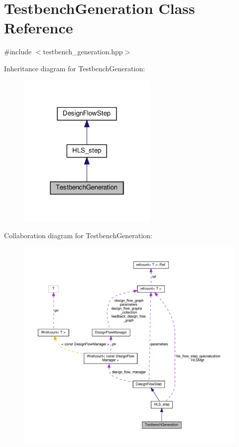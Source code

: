 \hypertarget{classTestbenchGeneration}{}\section{Testbench\+Generation Class Reference}
\label{classTestbenchGeneration}


{\ttfamily \#include $<$testbench\+\_\+generation.\+hpp$>$}



Inheritance diagram for Testbench\+Generation\+:
\nopagebreak
\begin{figure}[H]
\begin{center}
\leavevmode
\includegraphics[width=190pt]{da/dce/classTestbenchGeneration__inherit__graph}
\end{center}
\end{figure}


Collaboration diagram for Testbench\+Generation\+:
\nopagebreak
\begin{figure}[H]
\begin{center}
\leavevmode
\includegraphics[width=350pt]{dc/daf/classTestbenchGeneration__coll__graph}
\end{center}
\end{figure}

